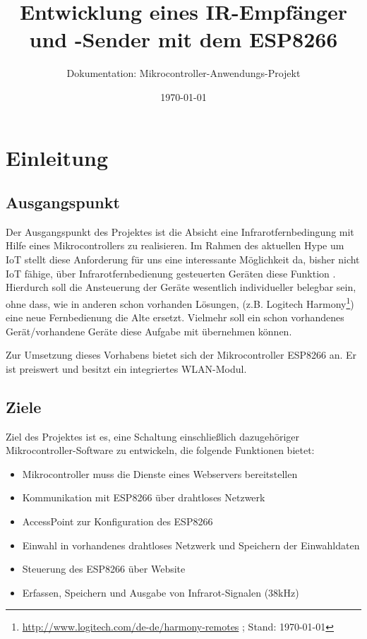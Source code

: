 			
\usepackage{tikz}			
\usetikzlibrary{shapes,arrows} %



\title{Entwicklung eines IR-Empfänger und -Sender mit dem ESP8266}
\subtitle{Dokumentation: Mikrocontroller-Anwendungs-Projekt}
\author{} %
\date{\today}

\maketitle

\tableofcontents										%
\pagebreak

\section{Einleitung}
\subsection{Ausgangspunkt}
Der Ausgangspunkt des Projektes ist die Absicht eine Infrarotfernbedingung mit Hilfe eines Mikrocontrollers zu realisieren. Im Rahmen des aktuellen Hype um \acs{IoT} stellt diese Anforderung für uns eine interessante Möglichkeit da, bisher nicht \acs{IoT} fähige, über Infrarotfernbedienung gesteuerten Geräten diese Funktion . Hierdurch soll die Ansteuerung der Geräte wesentlich individueller belegbar sein, ohne dass, wie in anderen schon vorhanden Lösungen, (z.B. Logitech Harmony\footnote{ \url{http://www.logitech.com/de-de/harmony-remotes} ; Stand: \today}) eine neue Fernbedienung die Alte ersetzt. Vielmehr soll ein schon vorhandenes Gerät/vorhandene Geräte diese Aufgabe mit übernehmen können.

Zur Umsetzung dieses Vorhabens bietet sich der Mikrocontroller ESP8266 an.
Er ist preiswert und besitzt ein integriertes WLAN-Modul.

\subsection{Ziele}
Ziel des Projektes ist es, eine Schaltung einschließlich dazugehöriger Mikrocontroller-Software zu entwickeln, die folgende Funktionen bietet:

\begin{itemize}
	\item Mikrocontroller muss die Dienste eines Webservers bereitstellen
	\item Kommunikation mit ESP8266 über drahtloses Netzwerk
	\item AccessPoint zur Konfiguration des ESP8266
	\item Einwahl in vorhandenes drahtloses Netzwerk und Speichern der Einwahldaten
	\item Steuerung des ESP8266 über Website
	\item Erfassen, Speichern und Ausgabe von Infrarot-Signalen (38kHz)
\end{itemize}

